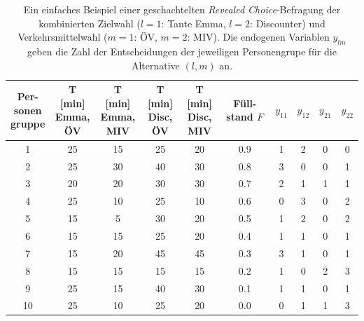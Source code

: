 \begin{table}
\begin{center}
\begin{tabular}{|c||c|c|c|c|c||c|c|c|c|} \hline
\myBox{3em}{Per-\\sonen\\gruppe} 
 & \myBox{3.5em}{T [min]\\Emma,\\ \"OV}
 & \myBox{3.5em}{T [min]\\Emma,\\  MIV}
 & \myBox{3.5em}{T [min]\\Disc,\\ \"OV}
 & \myBox{3.5em}{T [min]\\Disc,\\  MIV}
 & \myBox{3.5em}{F\"ull-\\stand \\$F$}
 & $y_{11}$ & $y_{12}$ & $y_{21}$ & $y_{22}$ \\ \hline
1  & 25 &  15 & 25 &  20 &  0.9 &  1 &  2 &  0 &  0 \\
2  & 25 &  30 & 40 &  30 &  0.8 &  3 &  0 &  0 &  1 \\
3  & 20 &  20 & 30 &  30 &  0.7 &  2 &  1 &  1 &  1 \\
4  & 25 &  10 & 25 &  10 &  0.6 &  0 &  3 &  0 &  2 \\
5  & 15 &   5 & 30 &  20 &  0.5 &  1 &  2 &  0 &  2 \\
6  & 15 &  15 & 25 &  20 &  0.4 &  1 &  1 &  0 &  1 \\
7  & 15 &  20 & 45 &  45 &  0.3 &  3 &  1 &  0 &  1 \\
8  & 15 &  15 & 15 &  15 &  0.2 &  1 &  0 &  2 &  3 \\
9  & 25 &  15 & 40 &  30 &  0.1 &  1 &  1 &  0 &  1 \\
10 & 25 &  10 & 25 &  20 &  0.0 &  0 &  1 &  1 &  3 \\ \hline
\end{tabular}
\end{center}
\caption{\label{tab:nestedLogit}Ein einfaches Beispiel einer
geschachtelten \emph{Revealed Choice}-Befragung der kombinierten
Zielwahl ($l=1$: Tante Emma, $l=2$: Discounter) und Verkehrsmittelwahl
($m=1$: \"OV, $m=2$: MIV). Die endogenen Variablen $y_{lm}$ geben die
Zahl der Entscheidungen der jeweiligen Personengrupe f\"ur die
Alternative $(l,m)$ an. }
\end{table}

